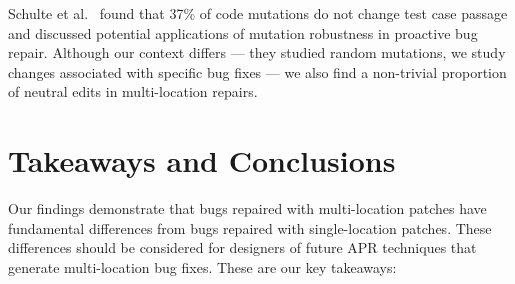 \documentclass[10pt, conference]{IEEEtran}
\begin{document}
Schulte et al.~\cite{schulte} found that 37\% of code mutations 
do not change test case passage and discussed potential applications 
of mutation robustness in proactive bug repair. 
Although our context differs --- they studied random mutations, 
we study changes associated with specific bug fixes --- we also find a 
non-trivial proportion of neutral edits in multi-location repairs.


\section{Takeaways and Conclusions}
\label{sec:takeaways}

Our findings demonstrate that bugs repaired with multi-location patches have
fundamental differences from bugs repaired with single-location patches. These
differences should be considered for designers of future APR techniques that
generate multi-location bug fixes. These are our key takeaways:
\end{document}
